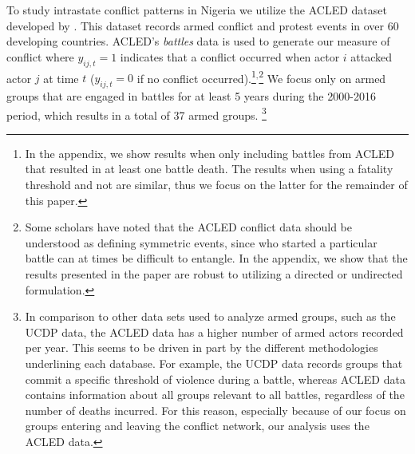 To study intrastate conflict patterns in Nigeria we utilize the ACLED dataset developed by \citet{raleigh:etal:2010}. This dataset records armed conflict and protest events in over 60 developing countries. ACLED's \textit{battles} data is used to generate our measure of conflict where $y_{ij,t} = 1$ indicates that a conflict occurred when actor $i$ attacked actor $j$ at time $t$ ($y_{ij,t} = 0$ if no conflict occurred).\footnote{In the appendix, we show results when only including battles from ACLED that resulted in at least one battle death. The results when using a fatality threshold and not are similar, thus we focus on the latter for the remainder of this paper.}$^{, }$\footnote{Some scholars have noted that the ACLED conflict data should be understood as defining symmetric events, since who started a particular battle can at times be difficult to entangle. In the appendix, we show that the results presented in the paper are robust to utilizing a directed or undirected formulation.}  We focus only on armed groups that are engaged in battles for at least 5 years during the 2000-2016 period, which results in a total of 37 armed groups. \footnote{In comparison to other data sets used to analyze armed groups, such as the UCDP data, the ACLED data has a higher number of armed actors recorded per year. This seems to be driven in part by the different methodologies underlining each database. For example, the UCDP data records groups that commit a specific threshold of violence during a battle, whereas ACLED data contains information about all groups relevant to all battles, regardless of the number of deaths incurred. For this reason, especially because of our focus on groups entering and leaving the conflict network, our analysis uses the ACLED data.}

